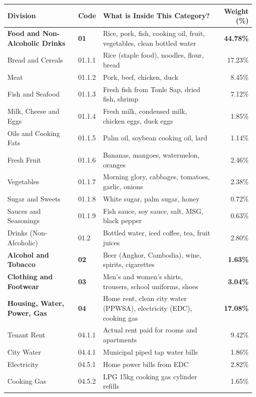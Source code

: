 \documentclass[11pt,a4paper,oneside]{article}
\begin{document}
\begin{longtable}{llp{7.5cm}r}
\toprule
\textbf{Division} & \textbf{Code} & \textbf{What is Inside This Category?} & \textbf{Weight (\%)} \\
\midrule
\endhead
\textbf{Food and Non-Alcoholic Drinks} & \textbf{01} & Rice, pork, fish, cooking oil, fruit, vegetables, clean bottled water & \textbf{44.78\%} \\
Bread and Cereals & 01.1.1 & Rice (staple food), noodles, flour, bread & 17.23\% \\
Meat & 01.1.2 & Pork, beef, chicken, duck & 8.45\% \\
Fish and Seafood & 01.1.3 & Fresh fish from Tonle Sap, dried fish, shrimp & 7.12\% \\
Milk, Cheese and Eggs & 01.1.4 & Fresh milk, condensed milk, chicken eggs, duck eggs & 1.85\% \\
Oils and Cooking Fats & 01.1.5 & Palm oil, soybean cooking oil, lard & 1.14\% \\
Fresh Fruit & 01.1.6 & Bananas, mangoes, watermelon, oranges & 2.46\% \\
Vegetables & 01.1.7 & Morning glory, cabbages, tomatoes, garlic, onions & 2.38\% \\
Sugar and Sweets & 01.1.8 & White sugar, palm sugar, honey & 0.72\% \\
Sauces and Seasonings & 01.1.9 & Fish sauce, soy sauce, salt, MSG, black pepper & 0.63\% \\
Drinks (Non-Alcoholic) & 01.2 & Bottled water, iced coffee, tea, fruit juices & 2.80\% \\
\midrule
\textbf{Alcohol and Tobacco} & \textbf{02} & Beer (Angkor, Cambodia), wine, spirits, cigarettes & \textbf{1.63\%} \\
\midrule
\textbf{Clothing and Footwear} & \textbf{03} & Men's and women's shirts, trousers, school uniforms, shoes & \textbf{3.04\%} \\
\midrule
\textbf{Housing, Water, Power, Gas} & \textbf{04} & Home rent, clean city water (PPWSA), electricity (EDC), cooking gas & \textbf{17.08\%} \\
Tenant Rent & 04.1.1 & Actual rent paid for rooms and apartments & 9.42\% \\
City Water & 04.4.1 & Municipal piped tap water bills & 1.86\% \\
Electricity & 04.5.1 & Home power bills from EDC & 2.82\% \\
Cooking Gas & 04.5.2 & LPG 15kg cooking gas cylinder refills & 1.65\% \\

\end{longtable}
\end{document}
